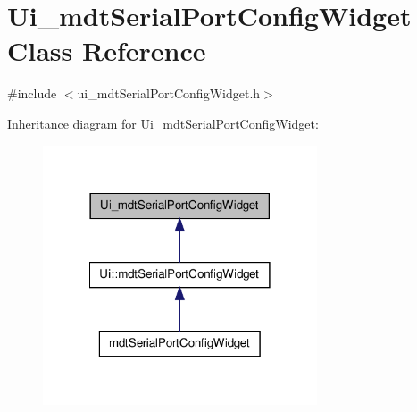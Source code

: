 \hypertarget{class_ui__mdt_serial_port_config_widget}{\section{Ui\-\_\-mdt\-Serial\-Port\-Config\-Widget Class Reference}
\label{class_ui__mdt_serial_port_config_widget}
}


{\ttfamily \#include $<$ui\-\_\-mdt\-Serial\-Port\-Config\-Widget.\-h$>$}



Inheritance diagram for Ui\-\_\-mdt\-Serial\-Port\-Config\-Widget\-:\nopagebreak
\begin{figure}[H]
\begin{center}
\leavevmode
\includegraphics[width=230pt]{class_ui__mdt_serial_port_config_widget__inherit__graph}
\end{center}
\end{figure}


